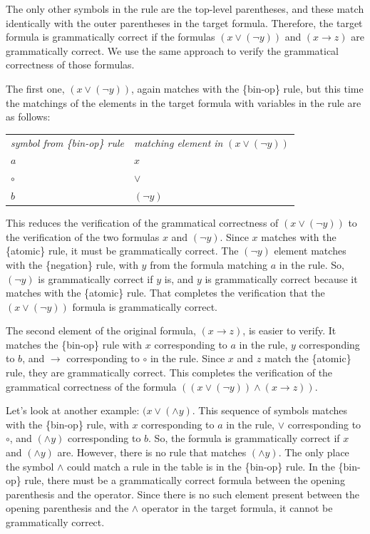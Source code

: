 The only other symbols in the rule are the top-level parentheses, and these match identically with the outer parentheses in the target formula. Therefore, the target formula is grammatically correct if the formulas $(x \vee (\neg y))$ and $(x \rightarrow z)$  are grammatically correct. We use the same approach to verify the grammatical correctness of those formulas.

The first one, $(x \vee (\neg y))$,
again matches with the \{bin-op\} rule,
but this time the matchings of the elements
in the target formula with variables in the rule are as follows:
\begin{center}
\begin{tabular}{ll}
\emph{symbol from \{bin-op\} rule}      & \emph{matching element in}  $(x \vee (\neg y))$ \\
$a$                                     & $x$ \\
$\circ$                                 & $\vee$ \\
$b$                                     & $(\neg y)$ \\
\end{tabular}
\end{center}

This reduces the verification of the grammatical correctness of $(x \vee (\neg y))$
to the verification of the two formulas $x$ and $(\neg y)$.
Since $x$ matches with the \{atomic\} rule, it must be grammatically correct.
The $(\neg y)$ element matches with the \{negation\} rule,
with $y$ from the formula matching $a$ in the rule.
So, $(\neg y)$ is grammatically correct if $y$ is,
and $y$ is grammatically correct because it matches with the \{atomic\} rule.
That completes the verification that the $(x \vee (\neg y))$ formula is grammatically correct.

The second element of the original formula,
$(x \rightarrow z)$, is easier to verify.
It matches the \{bin-op\} rule with $x$ corresponding to $a$ in the rule,
$y$ corresponding to $b$, and $\rightarrow$ corresponding to $\circ$ in the rule.
Since $x$ and $z$ match the \{atomic\} rule, they are grammatically correct.
This completes the verification of the grammatical
correctness of the formula $((x \vee (\neg y)) \wedge (x \rightarrow z))$.

Let's look at another example: $(x \vee (\wedge y)$.
This sequence of symbols matches with the \{bin-op\} rule,
with $x$ corresponding to $a$ in the rule,
$\vee$ corresponding to $\circ$,
and $(\wedge y)$ corresponding to $b$.
So, the formula is grammatically correct
if $x$ and $(\wedge y)$ are.
However, there is no rule that matches $(\wedge y)$.
The only place the symbol $\wedge$ could match a rule
in the table is in the \{bin-op\} rule.
In the \{bin-op\} rule, there must be
a grammatically correct formula between
the opening parenthesis and the operator.
Since there is no such element present
between the opening parenthesis
and the $\wedge$ operator in the target formula,
it cannot be grammatically correct.

